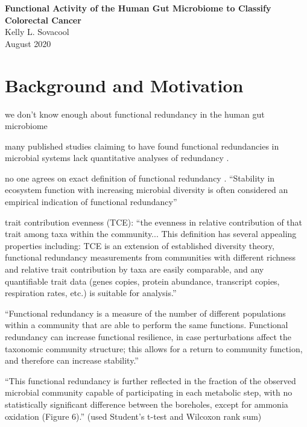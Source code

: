 \documentclass[11pt]{article}
\begin{document}
\sloppy
\begin{center}
\large{\textbf{
    Functional Activity of the Human Gut Microbiome to Classify Colorectal Cancer
}} \\
\vspace{11pt}
\small{
    Kelly L. Sovacool \\
    August 2020
}
\end{center}



\section*{Background and Motivation} %


we don't know enough about functional redundancy in the human gut microbiome \cite{heintz-buschart_human_2018}

many published studies claiming to have found functional redundancies in microbial systems lack quantitative analyses of redundancy \cite{souza_metagenomic_2015, ferrer_microbiota_2013}.

no one agrees on exact definition of functional redundancy \cite{louca_function_2018, heintz-buschart_human_2018, tully_dynamic_2018, royalty_quantitative_2020}.
``Stability in ecosystem function with increasing microbial diversity is often considered an empirical indication of functional redundancy''
\cite{royalty_quantitative_2020}


trait contribution evenness (TCE): ``the evenness in relative contribution of that trait among taxa within the community... This definition has several appealing properties including: TCE is an extension of established diversity theory, functional redundancy measurements from communities with different richness and relative trait contribution by taxa are easily comparable, and any quantifiable trait data (genes copies, protein abundance, transcript copies, respiration rates, etc.) is suitable for analysis.'' \cite{royalty_quantitative_2020}

``Functional redundancy is a measure of the number of different populations within a community that are able to perform the same functions. Functional redundancy can increase functional resilience, in case perturbations affect the taxonomic community structure; this allows for a return to community function, and therefore can increase stability.'' \cite{heintz-buschart_human_2018}

``This functional redundancy is further reflected in the fraction of the observed microbial community capable of participating in each metabolic step, with no statistically significant difference between the boreholes, except for ammonia oxidation (Figure 6).'' (used Student's t-test and Wilcoxon rank sum) \cite{tully_dynamic_2018}
\end{document}
